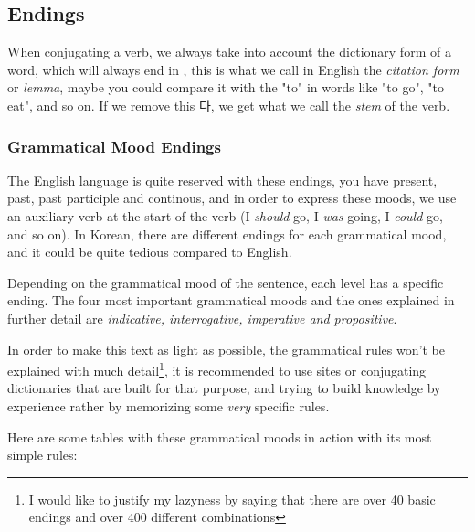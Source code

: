 \subsection{Endings}

When conjugating a verb, we always take into account the dictionary form of a word, which will always end in , this is what we call in English the \textit{citation form} or \textit{lemma}, maybe you could compare it with the "to" in words like "to go", "to eat", and so on. If we remove this 다, we get what we call the \textit{stem} of the verb.

\subsubsection{Grammatical Mood Endings}
The English language is quite reserved with these endings, you have present, past, past participle and continous, and in order to express these moods, we use an auxiliary verb at the start of the verb (I \textit{should} go, I \textit{was} going, I \textit{could} go, and so on). In Korean, there are different endings for each grammatical mood, and it could be quite tedious compared to English.

Depending on the grammatical mood  of the sentence, each level has a specific ending. The four most important grammatical moods and the ones explained in further detail are \textit{indicative, interrogative, imperative and propositive}.

In order to make this text as light as possible, the grammatical rules won't be explained with much detail\footnote{I would like to justify my lazyness by saying that there are over 40 basic endings and over 400 different combinations}, it is recommended to use sites or conjugating dictionaries that are built for that purpose, and trying to build knowledge by experience rather by memorizing some \textit{very} specific rules.

Here are some tables with these grammatical moods in action with its most simple rules:





